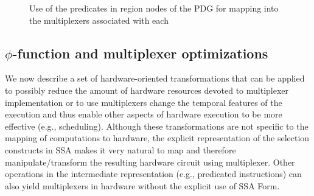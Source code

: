 \begin{figure}[htb]
  \centering
\caption{Use of the predicates in region nodes of the PDG for mapping into the multiplexers associated with each \phifun}
\label{fig:Fig.4.7}
\end{figure}


\subsection{$\phi$-function and multiplexer optimizations}
We now describe a set of hardware-oriented transformations that can be applied to possibly reduce the amount of hardware resources devoted to multiplexer implementation or to use multiplexers change the temporal features of the execution and thus enable other aspects of hardware execution to be more effective (e.g., scheduling).
Although these transformations are not specific to the mapping of computations to hardware, the explicit representation of the selection constructs in SSA makes it very natural to map and therefore manipulate/transform the resulting hardware circuit using multiplexer. 
Other operations in the intermediate representation (e.g., predicated instructions) can also yield multiplexers in hardware without the explicit use of SSA Form.

